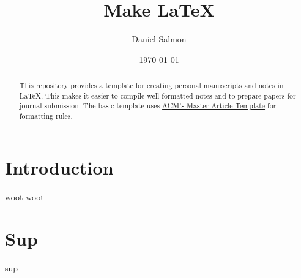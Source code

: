 \documentclass[manuscript,screen,nonacm]{acmart}
\begin{document}
\title{Make \LaTeX}

\author{Daniel Salmon}

\date{\today}

\begin{abstract}
	This repository provides a template for creating personal manuscripts and notes in \LaTeX. This makes it easier to compile well-formatted notes and to prepare papers for journal submission. The basic template uses \href{https://www.acm.org/publications/proceedings-template}{ACM's Master Article Template} for formatting rules.
\end{abstract}

\maketitle

\tableofcontents

\clearpage


\section{Introduction}
\label{sec:intro}

woot-woot

\section{Sup}
\label{sec:sup}

sup
\end{document}
